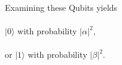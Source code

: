 \documentclass[preview]{standalone}
\begin{document}
\begin{center}
Examining these Qubits yields \\\\ $ | 0 \rangle $ with probability $ | \alpha |^2 $, \\\\ or $ |1 \rangle$ with probability $|\beta|^2$.
\end{center}
\end{document}
